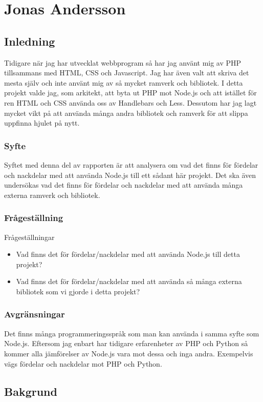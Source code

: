 \section{Jonas Andersson}
\subsection{Inledning} 

Tidigare när jag har utvecklat webbprogram så har jag använt mig av PHP tillsammans med HTML, CSS och Javascript. Jag har även valt att skriva det mesta själv och inte använt mig av så mycket ramverk och bibliotek. I detta projekt valde jag, som arkitekt, att byta ut PHP mot Node.js och att istället för ren HTML och CSS använda oss av Handlebars och Less. Dessutom har jag lagt mycket vikt på att använda många andra bibliotek och ramverk för att slippa uppfinna hjulet på nytt.

\subsubsection{Syfte}

Syftet med denna del av rapporten är att analysera om vad det finns för fördelar och nackdelar med att använda Node.js till ett sådant här projekt. Det ska även undersökas vad det finns för fördelar och nackdelar med att använda många externa ramverk och bibliotek.

\subsubsection{Frågeställning}
Frågeställningar
\begin{itemize}
	\item Vad finns det för fördelar/nackdelar med att använda Node.js till detta projekt?
	\item Vad finns det för fördelar/nackdelar med att använda så många externa bibliotek som vi gjorde i detta projekt?
\end{itemize}
\subsubsection{Avgränsningar}
Det finns många programmeringsspråk som man kan använda i samma syfte som Node.js. Eftersom jag enbart har tidigare erfarenheter av PHP och Python så kommer alla jämförelser av Node.js vara mot dessa och inga andra. Exempelvis vägs fördelar och nackdelar mot PHP och Python.
\subsection{Bakgrund}

